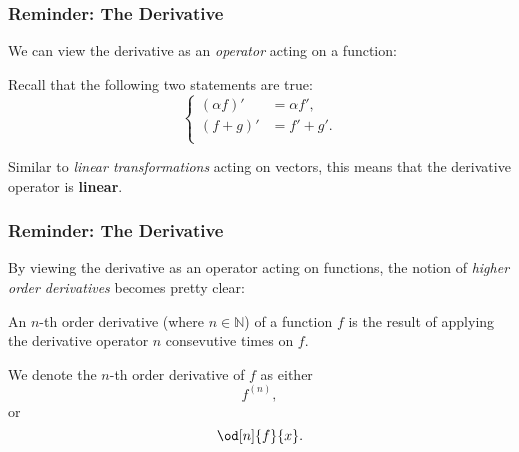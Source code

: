 \begin{frame}
	\frametitle{Reminder: The Derivative}
	We can view the derivative as an \emph{operator} acting on a function:

	\vspace{5mm}
	\centering
	\flushleft

	\vspace{5mm}
	Recall that the following two statements are true:
	\begin{equation*}
		\begin{cases}
			\left( \alpha f \right)' &= \alpha f',\\
			\left( f+g \right)' &= f' + g'.\\
		\end{cases}
	\end{equation*}

	Similar to \emph{linear transformations} acting on vectors, this means that the derivative operator is \textbf{linear}.
\end{frame}

\begin{frame}
	\frametitle{Reminder: The Derivative}
	By viewing the derivative as an operator acting on functions, the notion of \emph{higher order derivatives} becomes pretty clear:
	\begin{presentation_definition}
		An $n$-th order derivative (where $n\in\mathbb{N}$) of a function $f$ is the result of applying the derivative operator $n$ consevutive times on $f$.
	\end{presentation_definition}

	We denote the $n$-th order derivative of $f$ as either
	\begin{equation*}
		f^{(n)},
	\end{equation*}
	or
	\begin{equation*}
		\od[n]{f}{x}.
	\end{equation*}
\end{frame}



